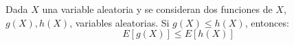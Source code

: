 \begin{coro}
    Dada $X$ una variable aleatoria y se consideran dos funciones de $X$, $g(X), h(X)$, variables aleatorias. Si $g(X)\leq h(X)$, entonces:
    \begin{equation*}
        E[g(X)]\leq E[h(X)]
    \end{equation*}
\end{coro}

